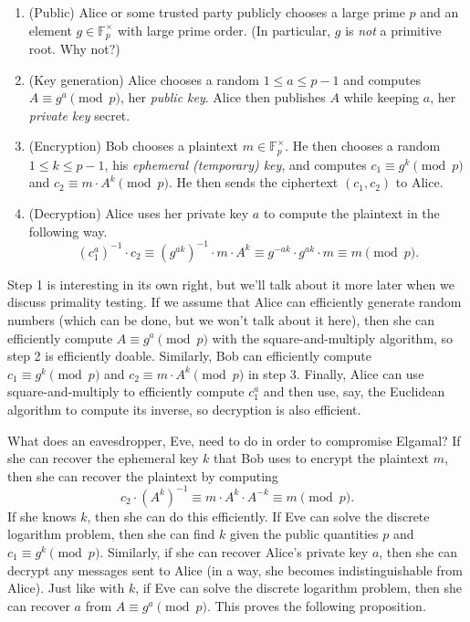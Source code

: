 \documentclass[12pt]{article}
\theoremstyle{plain}
\theoremstyle{definition}
\theoremstyle{remark}
\newcommand{\F}{\mathbb{F}}
\begin{document}
\begin{enumerate}
    \item (Public) Alice or some trusted party publicly chooses a large prime $p$ and an element $g \in \F_p^\times$ with large prime order. (In particular, $g$ is \emph{not} a primitive root. Why not?)

    \item (Key generation) Alice chooses a random $1\leq a\leq p-1$ and computes $A \equiv g^a\pmod p$, her \emph{public key}.
    Alice then publishes $A$ while keeping $a$, her \emph{private key} secret.

    \item (Encryption) Bob chooses a plaintext $m\in \F_p^\times$.
    He then chooses a random $1\leq k\leq p-1$, his \emph{ephemeral (temporary) key}, and computes $c_1 \equiv g^k\pmod p$ and $c_2 \equiv m\cdot A^k\pmod p$.
    He then sends the ciphertext $(c_1, c_2)$ to Alice.

    \item (Decryption) Alice uses her private key $a$ to compute the plaintext in the following way.
    \[
        (c_1^a)^{-1}\cdot c_2\equiv (g^{ak})^{-1}\cdot m\cdot A^k \equiv g^{-ak}\cdot g^{ak}\cdot m\equiv m\pmod p.
    \]
\end{enumerate}

Step 1 is interesting in its own right, but we'll talk about it more later when we discuss primality testing.
If we assume that Alice can efficiently generate random numbers (which can be done, but we won't talk about it here), then she can efficiently compute $A\equiv g^a\pmod p$ with the square-and-multiply algorithm, so step 2 is efficiently doable.
Similarly, Bob can efficiently compute $c_1 \equiv g^k\pmod p$ and $c_2 \equiv m\cdot A^k\pmod p$ in step 3.
Finally, Alice can use square-and-multiply to efficiently compute $c_1^a$ and then use, say, the Euclidean algorithm to compute its inverse, so decryption is also efficient.

What does an eavesdropper, Eve, need to do in order to compromise Elgamal?
If she can recover the ephemeral key $k$ that Bob uses to encrypt the plaintext $m$, then she can recover the plaintext by computing 
\[
    c_2\cdot (A^k)^{-1} \equiv m\cdot A^k\cdot A^{-k} \equiv m\pmod p.
\]
If she knows $k$, then she can do this efficiently.
If Eve can solve the discrete logarithm problem, then she can find $k$ given the public quantities $p$ and $c_1 \equiv g^k\pmod p$.
Similarly, if she can recover Alice's private key $a$, then she can decrypt any messages sent to Alice (in a way, she becomes indistinguishable from Alice).
Just like with $k$, if Eve can solve the discrete logarithm problem, then she can recover $a$ from $A \equiv g^a\pmod p$.
This proves the following proposition.
\end{document}
